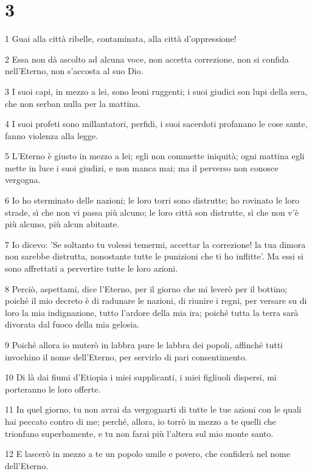 \chapter{3}

\par 1 Guai alla città ribelle, contaminata, alla città d'oppressione!
\par 2 Essa non dà ascolto ad alcuna voce, non accetta correzione, non si confida nell'Eterno, non s'accosta al suo Dio.
\par 3 I suoi capi, in mezzo a lei, sono leoni ruggenti; i suoi giudici son lupi della sera, che non serban nulla per la mattina.
\par 4 I suoi profeti sono millantatori, perfidi, i suoi sacerdoti profanano le cose sante, fanno violenza alla legge.
\par 5 L'Eterno è giusto in mezzo a lei; egli non commette iniquità; ogni mattina egli mette in luce i suoi giudizi, e non manca mai; ma il perverso non conosce vergogna.
\par 6 Io ho sterminato delle nazioni; le loro torri sono distrutte; ho rovinato le loro strade, sì che non vi passa più alcuno; le loro città son distrutte, sì che non v'è più alcuno, più alcun abitante.
\par 7 Io dicevo: 'Se soltanto tu volessi temermi, accettar la correzione! la tua dimora non sarebbe distrutta, nonostante tutte le punizioni che ti ho inflitte'. Ma essi si sono affrettati a pervertire tutte le loro azioni.
\par 8 Perciò, aspettami, dice l'Eterno, per il giorno che mi leverò per il bottino; poiché il mio decreto è di radunare le nazioni, di riunire i regni, per versare su di loro la mia indignazione, tutto l'ardore della mia ira; poiché tutta la terra sarà divorata dal fuoco della mia gelosia.
\par 9 Poiché allora io muterò in labbra pure le labbra dei popoli, affinché tutti invochino il nome dell'Eterno, per servirlo di pari consentimento.
\par 10 Di là dai fiumi d'Etiopia i miei supplicanti, i miei figliuoli dispersi, mi porteranno le loro offerte.
\par 11 In quel giorno, tu non avrai da vergognarti di tutte le tue azioni con le quali hai peccato contro di me; perché, allora, io torrò in mezzo a te quelli che trionfano superbamente, e tu non farai più l'altera sul mio monte santo.
\par 12 E lascerò in mezzo a te un popolo umile e povero, che confiderà nel nome dell'Eterno.
